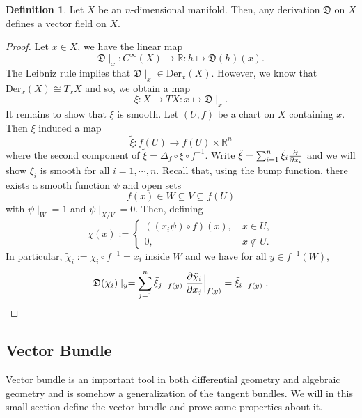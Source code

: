 \documentclass[]{article}
\theoremstyle{definition}
\theoremstyle{definition}
\newtheorem{definition}{Definition}[section]
\begin{document}
\begin{definition}
  Let \(X\) be an \(n\)-dimensional manifold. Then, any derivation 
  \(\mathfrak{D}\) on \(X\) defines a vector field on \(X\).
\end{definition}
\begin{proof}
  Let \(x \in X\), we have the linear map 
  \[\mathfrak{D}\mid_x : C^\infty(X) \to \mathbb{R} : h \mapsto \mathfrak{D}(h)(x).\]
  The Leibniz rule implies that \(\mathfrak{D}\mid_x \in \text{Der}_x(X)\). 
  However, we know that \(\text{Der}_x(X) \cong T_xX\) and so, we obtain a 
  map 
  \[\xi : X \to TX : x \mapsto \mathfrak{D}\mid_x.\]
  It remains to show that \(\xi\) is smooth. Let \((U, f)\) be a chart on 
  \(X\) containing \(x\). Then \(\xi\) induced a map 
  \[\tilde \xi : f(U) \to f(U) \times \mathbb{R}^n\]
  where the second component of \(\tilde \xi = \Delta_f \circ \xi \circ f^{-1}\).
  Write \(\tilde \xi = \sum_{i = 1}^n \tilde \xi_i \pdv{x_i}\) and we will 
  show \(\xi_i\) is smooth for all \(i = 1, \cdots, n\). Recall that, using 
  the bump function, there exists a smooth function \(\psi\) and open sets 
  \[f(x) \in W \subseteq V \subseteq f(U)\]
  with \(\psi\mid_W = 1\) and \(\psi\mid_{X / V} = 0\). Then, defining 
  \[\chi(x) := \begin{cases}
    ((x_i\psi) \circ f)(x), \ & x \in U,\\
    0, & x \not\in U.
  \end{cases}\]
  In particular, \(\tilde \chi_i := \chi_i \circ f^{-1} = x_i\) inside \(W\) and 
  we have for all \(y \in f^{-1}(W)\), 
  \[\mathfrak{D}(\chi_i)\mid_y = \sum_{j = 1}^n \tilde \xi_j \mid_{f(y)} 
    \pdv{\tilde \chi_i}{x_j}\Big\vert_{f(y)} = \tilde \xi_i \mid_{f(y)}.\]
\end{proof}

\subsection{Vector Bundle}

Vector bundle is an important tool in both differential geometry and 
algebraic geometry and is somehow a generalization of the tangent bundles. 
We will in this small section define the vector bundle and prove some properties 
about it.
\end{document}
